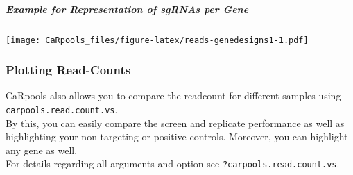 \documentclass[]{article}
\newenvironment{Shaded}{\begin{snugshade}}{\end{snugshade}}
\newcommand{\KeywordTok}[1]{\textcolor[rgb]{0.13,0.29,0.53}{\textbf{{#1}}}}
\newcommand{\DataTypeTok}[1]{\textcolor[rgb]{0.13,0.29,0.53}{{#1}}}
\newcommand{\DecValTok}[1]{\textcolor[rgb]{0.00,0.00,0.81}{{#1}}}
\newcommand{\StringTok}[1]{\textcolor[rgb]{0.31,0.60,0.02}{{#1}}}
\newcommand{\NormalTok}[1]{{#1}}
\let\oldsubparagraph\subparagraph
\renewcommand{\subparagraph}[1]{\oldsubparagraph{#1}\mbox{}}
\begin{document}
\subparagraph{Example for Representation of sgRNAs per
Gene}\label{example-for-representation-of-sgrnas-per-gene}

\begin{Shaded}
\end{Shaded}

\texttt{[image: CaRpools\_files/figure-latex/reads-genedesigns1-1.pdf]}

\subsubsection{Plotting Read-Counts}\label{plotting-read-counts}

CaRpools also allows you to compare the readcount for different samples
using \texttt{carpools.read.count.vs}.\\
By this, you can easily compare the screen and replicate performance as
well as highlighting your non-targeting or positive controls. Moreover,
you can highlight any gene as well.\\
For details regarding all arguments and option see
\texttt{?carpools.read.count.vs}.
\end{document}
